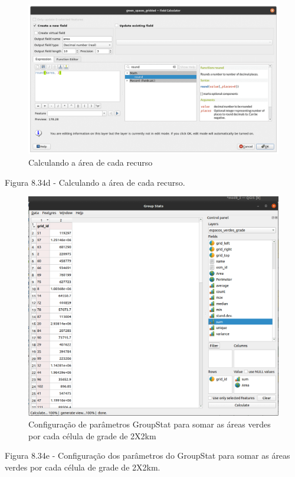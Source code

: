 \documentclass[
]{krantz}
\begin{document}
\begin{figure}
\centering
\includegraphics{media/modulo8/fig834_d.png}
\caption{Calculando a área de cada recurso}
\end{figure}

Figura 8.34d - Calculando a área de cada recurso.

\begin{figure}
\centering
\includegraphics{media/modulo8/fig834_e.png}
\caption{Configuração de parâmetros GroupStat para somar as áreas verdes por cada célula de grade de 2X2km}
\end{figure}

Figura 8.34e - Configuração dos parâmetros do GroupStat para somar as áreas verdes por cada célula de grade de 2X2km.
\end{document}
